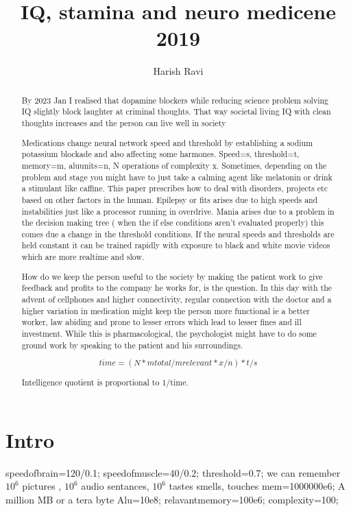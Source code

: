 \documentclass[a4paper]{article}
\title{ IQ, stamina and neuro medicene 2019}
\author{Harish Ravi}
\begin{document}
\maketitle

\begin{abstract}
By 2023 Jan I realised that dopamine blockers while reducing science problem solving IQ slightly block laughter at criminal thoughts. That way societal living IQ with clean thoughts increases and the person can live well in society

Medications change neural network speed and threshold by establishing a sodium potassium blockade and also affecting some harmones. Speed=s, threshold=t, memory=m, aluunits=n, N operations of complexity x. Sometimes, depending on the problem and stage you might have to just take a calming agent like melatonin or drink a stimulant like caffine. This paper prescribes how to deal with disorders, projects etc based on other factors in the human. Epilepsy or fits arises due to high speeds and instabilities just like a processor running in overdrive. Mania arises due to a problem in the decision making tree ( when the if else conditions aren't evaluated properly) this comes due a change in the threshold conditions. If the neural speeds and thresholds are held constant it can be trained rapidly with exposure to black and white movie videos which are more realtime and slow.

How do we keep the person useful to the society by making the patient work to give feedback and profits to the company he works for, is the question. In this day with the advent of cellphones and higher connectivity, regular connection with the doctor and a higher variation in medication might keep the person more functional ie a better worker, law abiding and prone to lesser errors which lead to lesser fines and ill investment. While this is pharmacological, the psychologist might have to do some ground work by speaking to the patient and his surroundings.



$$time=(N*mtotal/mrelevant*x/n)*t/s$$

Intelligence quotient is proportional to 1/time.

\end{abstract}

\section{Intro}

speedofbrain=120/0.1;
speedofmuscle=40/0.2;
threshold=0.7;
we can remember $10^6$ pictures , $10^6$ audio sentances, $10^6$ tastes smells, touches
mem=1000000e6;  A million MB or a tera byte
Alu=10e8;
relavantmemory=100e6;
complexity=100;
\end{document}
